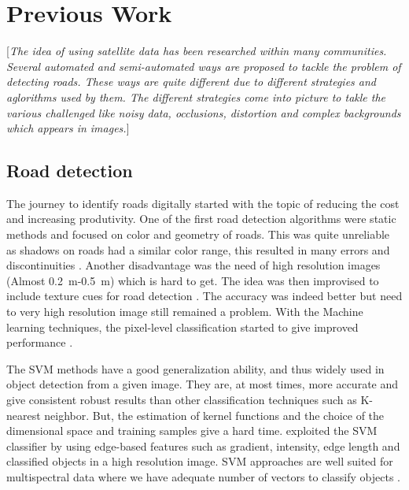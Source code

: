 
\chapter{Previous Work}\label{chapt:previous}
[\textit{The idea of using satellite data has been researched within many communities. Several automated and semi-automated ways are proposed to tackle the problem of detecting roads. These ways are quite different due to different strategies and aglorithms used by them. The different strategies come into picture to takle the various challenged like noisy data, occlusions, distortion and complex backgrounds which appears in images.}]

\section{Road detection}
The journey to identify roads digitally started with the topic of reducing the cost and increasing produtivity. One of the first road detection algorithms were static methods and focused on color and geometry of roads. This was quite unreliable as shadows on roads had a similar color range, this resulted in many errors and discontinuities \cite{Detecting_interections_using_color,Detecting_roads_using_color}. Another disadvantage was the need of high resolution images (Almost 0.2~m-0.5~m) which is hard to get. The idea was then improvised to include texture cues for road detection \cite{using_texture_for_road_detection,baumgartner1999automatic}. The accuracy was indeed better but need to very high resolution image still remained a problem. With the Machine learning techniques, the pixel-level classification started to give improved performance \cite{road_detection_using_neural_nets_SVM,road_detection_using_env_learning,road_detection_using_SVM_online_learning}. \par

The SVM methods have a good generalization ability, and thus widely used in object detection from a given image. They are, at most times, more accurate and give consistent robust results than other classification techniques such as K-nearest neighbor. But, the estimation of kernel functions and the choice of the dimensional space and training samples give a hard time. %
exploited the SVM classifier by using edge-based features such as gradient, intensity, edge length and classified objects in a high resolution image. SVM approaches are well suited for multispectral data where we have adequate number of vectors to classify objects %
. \par

